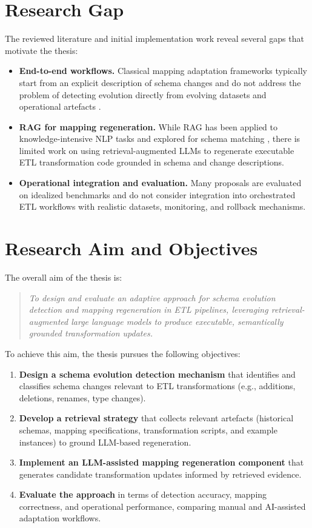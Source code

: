 \section{Research Gap}

The reviewed literature and initial implementation work reveal several gaps
that motivate the thesis:
%
\begin{itemize}
  \item \textbf{End-to-end workflows.} Classical mapping adaptation frameworks
  typically start from an explicit description of schema changes and do not
  address the problem of detecting evolution directly from evolving datasets
  and operational artefacts \cite{velegrakis2003mapping,yu2005semantic}.
  \item \textbf{RAG for mapping regeneration.} While RAG has been applied to
  knowledge-intensive NLP tasks \cite{lewis2020retrieval} and explored for
  schema matching \cite{sheetrit2024rematch}, there is limited work on using
  retrieval-augmented LLMs to regenerate executable ETL transformation code
  grounded in schema and change descriptions.
  \item \textbf{Operational integration and evaluation.} Many proposals are
  evaluated on idealized benchmarks and do not consider integration into
  orchestrated ETL workflows with realistic datasets, monitoring, and
  rollback mechanisms.
\end{itemize}

\section{Research Aim and Objectives}

The overall aim of the thesis is:
%
\begin{quote}
  \emph{To design and evaluate an adaptive approach for schema evolution
  detection and mapping regeneration in ETL pipelines, leveraging
  retrieval-augmented large language models to produce executable, semantically
  grounded transformation updates.}
\end{quote}

To achieve this aim, the thesis pursues the following objectives:
%
\begin{enumerate}
  \item \textbf{Design a schema evolution detection mechanism} that identifies
  and classifies schema changes relevant to ETL transformations (e.g.,
  additions, deletions, renames, type changes).
  \item \textbf{Develop a retrieval strategy} that collects relevant artefacts
  (historical schemas, mapping specifications, transformation scripts, and
  example instances) to ground LLM-based regeneration.
  \item \textbf{Implement an LLM-assisted mapping regeneration component} that
  generates candidate transformation updates informed by retrieved evidence.
  \item \textbf{Evaluate the approach} in terms of detection accuracy, mapping
  correctness, and operational performance, comparing manual and AI-assisted
  adaptation workflows.
\end{enumerate}

